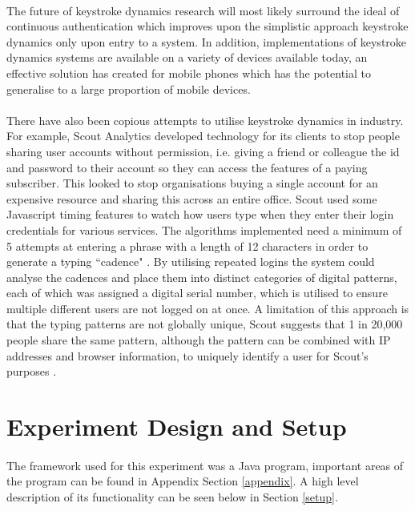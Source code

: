 \documentclass{article}
\begin{document}
\paragraph{}

The future of keystroke dynamics research will most likely surround the ideal of continuous authentication which improves upon the simplistic approach keystroke dynamics only upon entry to a system. In addition, implementations of keystroke dynamics systems are available on a variety of devices available today, an effective solution has created for mobile phones \parencite{maiorana2011keystroke} which has the potential to generalise to a large proportion of mobile devices.  

\paragraph{}
There have also been copious attempts to utilise keystroke dynamics in industry. For example, Scout Analytics developed technology for its clients to stop people sharing user accounts without permission, i.e. giving a friend or colleague the id and password to their account so they can access the features of a paying subscriber. This looked to stop organisations buying a single account for an expensive resource and sharing this across an entire office. Scout used some Javascript timing features to watch how users type when they enter their login credentials for various services. The algorithms implemented need a minimum of 5 attempts at entering a phrase with a length of 12 characters in order to generate a typing ``cadence" \parencite{arsTech}. By utilising repeated logins the system could analyse the cadences and place them into distinct categories of digital patterns, each of which was assigned a digital serial number, which is utilised to ensure multiple different users are not logged on at once. A limitation of this approach is that the typing patterns are not globally unique, Scout suggests that 1 in 20,000 people share the same pattern, although the pattern can be combined with IP addresses and browser information, to uniquely identify a user for Scout's purposes \parencite{arsTech}. 

\section{Experiment Design and Setup} \label{experiment}
\paragraph{}
The framework used for this experiment was a Java program, important areas of the program can be found in Appendix Section \ref{appendix}. A high level description of its functionality can be seen below in Section \ref{setup}. 
\end{document}
